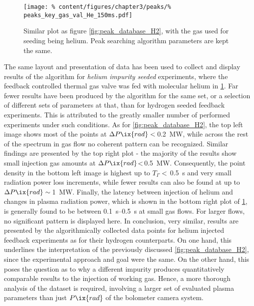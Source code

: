 %
        \begin{figure}[t]%
            \centering%
            \texttt{[image: \%
                content/figures/chapter3/peaks/\%
                peaks\_key\_gas\_val\_He\_150ms.pdf]}%
            \caption{Similar plot as figure \cref{fig:peak_database_H2}, with the gas used for seeding being helium. Peak searching algorithm parameters are kept the same.}\label{fig:peak_database_He}%
        \end{figure}%
%
        The same layout and presentation of data has been used to collect and display results of the algorithm for \textit{helium impurity seeded} experiments, where the feedback controlled thermal gas valve was fed with molecular helium in \cref{fig:peak_database_He}. Far fewer results have been produced by the algorithm for the same set, or a selection of different sets of parameters at that, than for hydrogen seeded feedback experiments. This is attributed to the greatly smaller number of performed experiments under such conditions. As for \cref{fig:peak_database_H2}, the top left image shows most of the points at $\Delta P\ix{rad}<$\,\SI{0.2}{\mega\watt}, while across the rest of the spectrum in gas flow no coherent pattern can be recognized. Similar findings are presented by the top right plot - the majority of the results show small injection gas amounts at $\Delta P\ix{rad}$<\,\SI{0.5}{\mega\watt}. Consequently, the point density in the bottom left image is highest up to $T_{\Gamma}<$\,\SI{0.5}{\second} and very small radiation power loss increments, while fewer results can also be found at up to $\Delta P\ix{rad}\sim$\,\SI{1}{\mega\watt}. Finally, the latency between injection of helium and changes in plasma radiation power, which is shown in the bottom right plot of \cref{fig:peak_database_He}, is generally found to be between \SIrange{0.1}{0.5}{\second} at small gas flows. For larger flows, no significant pattern is displayed here. In conclusion, very similar, results are presented by the algorithmically collected data points for helium injected feedback experiments as for their hydrogen counterparts. On one hand, this underlines the interpretation of the previously discussed \cref{fig:peak_database_H2}, since the experimental approach and goal were the same. On the other hand, this poses the question as to why a different impurity produces quantitatively comparable results to the injection of working gas. Hence, a more thorough analysis of the dataset is required, involving a larger set of evaluated plasma parameters than just $P\ix{rad}$ of the bolometer camera system.\\%
